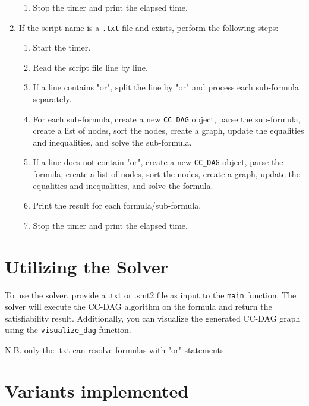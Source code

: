 \documentclass[11pt]{report}
\begin{document}
\begin{enumerate}
\begin{enumerate}
        \item Stop the timer and print the elapsed time.
    \end{enumerate}
    
    \item If the script name is a \texttt{.txt} file and exists, perform the following steps:
    \begin{enumerate}
        \item Start the timer.
        
        \item Read the script file line by line.
        
        \item If a line contains "or", split the line by "or" and process each sub-formula separately.
        
        \item For each sub-formula, create a new \texttt{CC\_DAG} object, parse the sub-formula, create a list of nodes, sort the nodes, create a graph, update the equalities and inequalities, and solve the sub-formula.
        
        \item If a line does not contain "or", create a new \texttt{CC\_DAG} object, parse the formula, create a list of nodes, sort the nodes, create a graph, update the equalities and inequalities, and solve the formula.
        
        \item Print the result for each formula/sub-formula.
        
        \item Stop the timer and print the elapsed time.
    \end{enumerate}
\end{enumerate}
\section*{Utilizing the Solver}
To use the solver, provide a .txt or .smt2 file as input to the \texttt{main} function. The solver will execute the CC-DAG algorithm on the formula and return the satisfiability result. 
Additionally, you can visualize the generated CC-DAG graph using the \texttt{visualize\_dag} function.

N.B. only the .txt can resolve formulas with "or" statements. 

\section*{Variants implemented}
\end{document}
